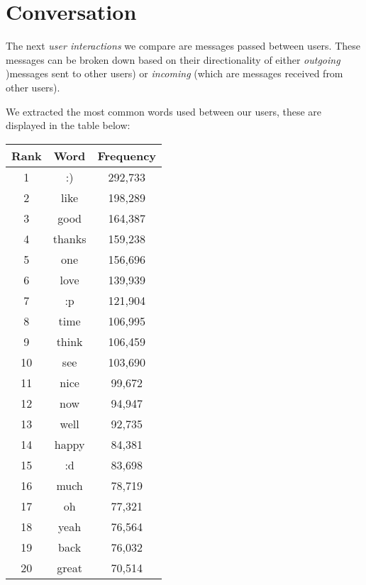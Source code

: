 \section{Conversation}
\label{sec:groups}

The next \emph{user interactions} we compare are messages passed between users. These messages can be broken down based on their 
directionality of either \emph{outgoing} )messages sent to other users) or 
\emph{incoming} (which are messages received from other users).

We extracted the most common words used between our users, these are displayed in the table below:

\begin{table}[!htbp]
\begin{minipage}[b]{.5\textwidth}
	\centering
	\begin{tabular}{|c|c|c|} %
		\hline
		\textbf{Rank} & \textbf{Word} & \textbf{Frequency}  \\ \hline
		1 & :) & 292,733 \\ \hline
		2 & like & 198,289 \\ \hline
		3 & good & 164,387 \\ \hline
		4 & thanks & 159,238 \\ \hline
		5 & one & 156,696 \\ \hline
		6 & love & 139,939 \\ \hline
		7 & :p & 121,904 \\ \hline
		8 & time & 106,995 \\ \hline
		9 & think & 106,459 \\ \hline
		10 & see & 103,690 \\ \hline
		11 & nice & 99,672 \\ \hline
		12 & now & 94,947 \\ \hline
		13 & well & 92,735 \\ \hline
		14 & happy & 84,381 \\ \hline
		15 & :d & 83,698 \\ \hline
		16 & much & 78,719 \\ \hline
		17 & oh & 77,321 \\ \hline
		18 & yeah & 76,564 \\ \hline
		19 & back & 76,032 \\ \hline
		20 & great & 70,514 \\ \hline
		\end{tabular}
\end{minipage}
\begin{minipage}[b]{.5\textwidth}

\end{minipage}
\end{table}

